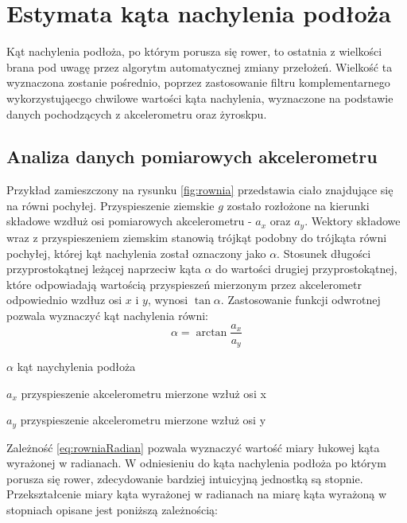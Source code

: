 \section{Estymata kąta nachylenia podłoża}
Kąt nachylenia podłoża, po którym porusza się rower, to ostatnia z wielkości  brana pod uwagę przez algorytm automatycznej zmiany przełożeń. Wielkość ta wyznaczona zostanie pośrednio, poprzez zastosowanie filtru komplementarnego wykorzystująecgo chwilowe wartości kąta nachylenia, wyznaczone na podstawie danych pochodzących z akcelerometru oraz żyroskpu.

\subsection{Analiza danych pomiarowych akcelerometru}
\label{pomiaryAkcel}
Przykład zamieszczony na rysunku \ref{fig:rownia} przedstawia ciało znajdujące się na równi pochyłej. Przyspieszenie ziemskie \textit{$g$} zostało rozłożone na kierunki składowe wzdłuż osi pomiarowych akcelerometru - \textit{$a_x$} oraz \textit{$a_y$}. Wektory składowe wraz z przyspieszeniem ziemskim stanowią trójkąt podobny do trójkąta równi pochyłej, której kąt nachylenia został oznaczony jako $\alpha$. Stosunek długości przyprostokątnej leżącej naprzeciw kąta $\alpha$ do wartości drugiej przyprostokątnej, które odpowiadają wartością przyspieszeń mierzonym przez akcelerometr odpowiednio wzdłuz osi $x$ i $y$, wynosi $\tan{\alpha}$. Zastosowanie funkcji odwrotnej pozwala wyznaczyć kąt nachylenia równi:
\begin{equation}
    \alpha=\arctan{\frac{a_x}{a_y}}
    \label{eq:rowniaRadian}
\end{equation}
\begin{eqwhere}[2cm]
	\item[$\alpha$] kąt naychylenia podłoża
	\item[$a_x$] przyspieszenie akcelerometru mierzone wzłuż osi x
	\item[$a_y$] przyspieszenie akcelerometru mierzone wzłuż osi y
\end{eqwhere}
Zależność \ref{eq:rowniaRadian} pozwala wyznaczyć wartość miary łukowej kąta wyrażonej w radianach. W odniesieniu do kąta nachylenia podłoża po którym porusza się rower, zdecydowanie bardziej intuicyjną jednostką są stopnie. Przekształcenie miary kąta wyrażonej w radianach na miarę kąta wyrażoną w stopniach opisane jest poniższą zależnością:
